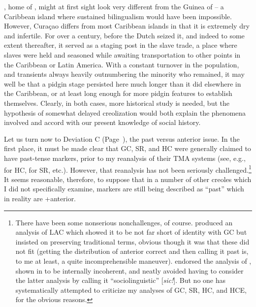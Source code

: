 , home of  , might at first sight look very different from the Guinea of  -- a Caribbean island where sustained bilingualism would have been impossible. However, Curaçao differs from most Caribbean islands in that it is extremely dry and infertile. For over a century, before the Dutch seized it, and indeed to some extent thereafter, it served as a staging post in the slave trade, a place where slaves were held and seasoned while awaiting trans\-portation to other points in the Caribbean or Latin America. With a constant turnover in the population, and transients always heavily outnumbering the minority who remained, it may well be that a pidgin stage persisted here much longer than it did elsewhere in the Caribbean, or at least long enough for more pidgin features to establish themselves. Clearly, in both cases, more historical study is needed, but the hypothe\-sis of somewhat delayed creolization would both explain the phe\-nomena involved and accord with our present knowledge of social history.


Let us turn now to Deviation C (Page~\pageref{majordeviations}), the past versus anterior issue. In the first place, it must be made clear that GC, SR, and HC were generally claimed to have past-tense markers, prior to my re\-analysis of their TMA systems (see, e.g., \citet{Hall1953} for HC, \citet{Voorhoeve1957} for SR, etc.). However, that reanalysis has not been seriously challenged.\footnote{There have been some nonserious nonchallenges, of course. \citet{Christie1976} produced an analysis of LAC which showed it to be not far short of identity with GC but insisted on preserving traditional terms, obvious though it was that these did not fit (getting the distri\-bution of anterior correct and then calling it past is, to me at least, a quite incomprehensible maneuver). \citet{Seuren1980} endorsed the analysis of \citet{Voorhoeve1957}, shown in \citet{Bickerton1975} to be intern\-ally incoherent, and neatly avoided having to consider the latter analy\-sis by calling it ``sociolinguistic'' [\textit{sic!}]. But no one has systematically attempted to criticize my analyses of GC, SR, HC, and HCE, for the obvious reasons.} It seems reasonable, therefore, to suppose that in a number of other creoles which I did not specifically examine, markers are still being described as ``past'' which in reality are +anterior.

